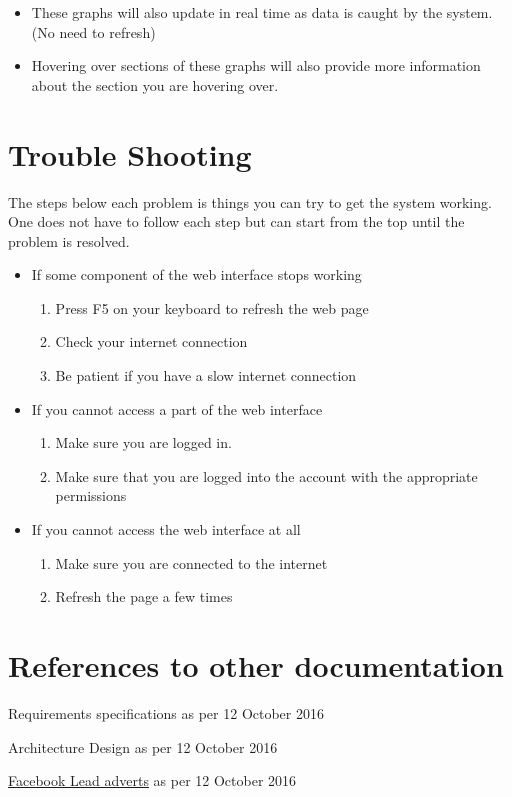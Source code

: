 \documentclass{article}
\begin{document}
			\begin{itemize}
				\item These graphs will also update in real time as data is caught by the system. (No need to refresh)
				\item Hovering over sections of these graphs will also provide more information about the section you are hovering over.
			\end{itemize}

	\section{Trouble Shooting}
		The steps below each problem is things you can try to get the system working.
		One does not have to follow each step but can start from the top until the problem is resolved.
		\begin{itemize}
			\item If some component of the web interface stops working
				\begin{enumerate}
					\item Press F5 on your keyboard to refresh the web page
					\item Check your internet connection
					\item Be patient if you have a slow internet connection
				\end{enumerate}
			\item If you cannot access a part of the web interface
				\begin{enumerate}
					\item Make sure you are logged in.
					\item Make sure that you are logged into the account with the appropriate permissions
				\end{enumerate}
			\item If you cannot access the web interface at all
				\begin{enumerate}
					\item Make sure you are connected to the internet
					\item Refresh the page a few times
				\end{enumerate}
		\end{itemize}

	\section{References to other documentation}
		\item{Requirements specifications as per 12 October 2016}
		\item{Architecture Design as per 12 October 2016}
		\item{\href{https://www.facebook.com/business/a/lead-ads}{Facebook Lead adverts} as per 12 October 2016}
\end{document}
